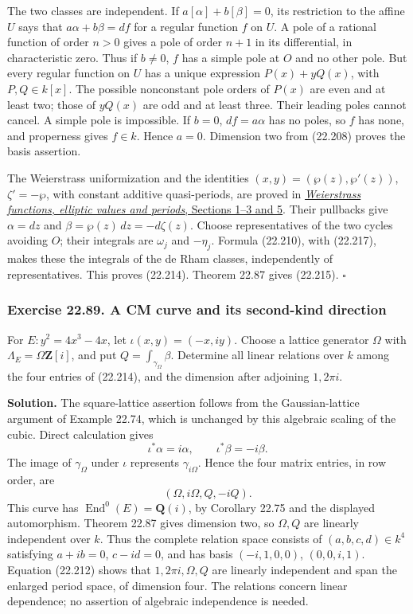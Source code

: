 \documentclass[
  11pt,
  a4paper,
]{article}
\newcounter{none} %
\begin{document}
The two classes are independent. If \(a[\alpha]+b[\beta]=0\), its
restriction to the affine \(U\) says that \(a\alpha+b\beta=df\) for a
regular function \(f\) on \(U\). A pole of a rational function of order
\(n>0\) gives a pole of order \(n+1\) in its differential, in
characteristic zero. Thus if \(b\ne0\), \(f\) has a simple pole at \(O\)
and no other pole. But every regular function on \(U\) has a unique
expression \(P(x)+yQ(x)\), with \(P,Q\in k[x]\). The possible
nonconstant pole orders of \(P(x)\) are even and at least two; those of
\(yQ(x)\) are odd and at least three. Their leading poles cannot cancel.
A simple pole is impossible. If \(b=0\), \(df=a\alpha\) has no poles, so
\(f\) has none, and properness gives \(f\in k\). Hence \(a=0\).
Dimension two from (22.208) proves the basis assertion.

The Weierstrass uniformization and the identities
\((x,y)=(\wp(z),\wp'(z))\), \(\zeta'=-\wp\), with constant additive
quasi-periods, are proved in
\href{https://kokunoyumeto.github.io/open-math-courses-public/courses/TR-TRANS/TR-TRANS-08.html\#3-entire-quotients-of-strict-order-two}{\emph{Weierstrass
functions, elliptic values and periods}, Sections 1--3 and 5}. Their
pullbacks give \(\alpha=dz\) and \(\beta=\wp(z)\,dz=-d\zeta(z)\). Choose
representatives of the two cycles avoiding \(O\); their integrals are
\(\omega_j\) and \(-\eta_j\). Formula (22.210), with (22.217), makes
these the integrals of the de Rham classes, independently of
representatives. This proves (22.214). Theorem 22.87 gives (22.215).
\(\square\)

\subsubsection{Exercise 22.89. A CM curve and its second-kind
direction}\label{exercise-22.89.-a-cm-curve-and-its-second-kind-direction}

For \(E:y^2=4x^3-4x\), let \(\iota(x,y)=(-x,iy)\). Choose a lattice
generator \(\Omega\) with \(\Lambda_E=\Omega\mathbf Z[i]\), and put
\(Q=\int_{\gamma_\Omega}\beta\). Determine all linear relations over
\(k\) among the four entries of (22.214), and the dimension after
adjoining \(1,2\pi i\).

\textbf{Solution.} The square-lattice assertion follows from the
Gaussian-lattice argument of Example 22.74, which is unchanged by this
algebraic scaling of the cubic. Direct calculation gives \[
 \iota^*\alpha=i\alpha,\qquad
 \iota^*\beta=-i\beta.
 \tag{22.218}
\] The image of \(\gamma_\Omega\) under \(\iota\) represents
\(\gamma_{i\Omega}\). Hence the four matrix entries, in row order, are
\[
 (\Omega,i\Omega,Q,-iQ).
 \tag{22.219}
\] This curve has \(\operatorname{End}^0(E)=\mathbf Q(i)\), by Corollary
22.75 and the displayed automorphism. Theorem 22.87 gives dimension two,
so \(\Omega,Q\) are linearly independent over \(k\). Thus the complete
relation space consists of \((a,b,c,d)\in k^4\) satisfying \(a+ib=0\),
\(c-id=0\), and has basis \((-i,1,0,0)\), \((0,0,i,1)\). Equation
(22.212) shows that \(1,2\pi i,\Omega,Q\) are linearly independent and
span the enlarged period space, of dimension four. The relations concern
linear dependence; no assertion of algebraic independence is needed.
\end{document}

